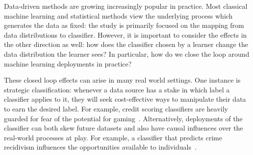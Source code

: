 
Data-driven methods are growing increasingly popular in practice. Most classical machine learning and statistical methods view the underlying process which generates the data as fixed: the study is primarily focused on the mapping from data distributions to classifier. However, it is important to consider the effects in the other direction as well: how does the classifier chosen by a learner change the data distribution the learner sees? In particular, how do we close the loop around machine learning deployments in practice?

These closed loop effects can arise in many real world settings. One instance is strategic classification: whenever a data source has a stake in which label a classifier applies to it, they will seek cost-effective ways to manipulate their data to earn the desired label. For example, credit scoring classifiers are heavily guarded for fear of the potential for gaming~\citep{Hardt:2016we}. 
Alternatively, deployments of the classifier can both skew future datasets and also have causal influences over the real-world processes at play. For example, a classifier that predicts crime recidivism influences the opportunities available to individuals~\citep{Dressel:2018uf}.


